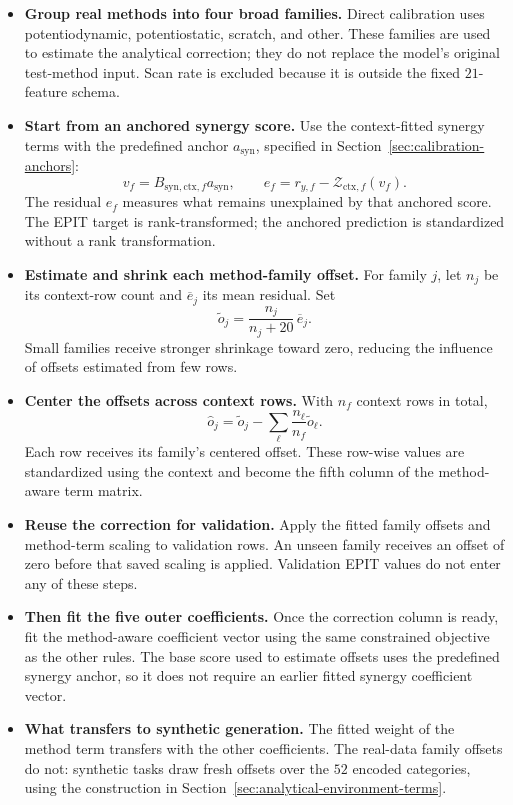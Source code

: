 \documentclass[11pt]{article}
\newenvironment{notes}
  {\begin{itemize}\setlength{\itemsep}{0.45em}\setlength{\parsep}{0pt}}
  {\end{itemize}}
\begin{document}
\begin{notes}
    \item \textbf{Group real methods into four broad families.}
    Direct calibration uses potentiodynamic, potentiostatic,
    scratch, and other. These families are used to estimate
    the analytical correction; they do not replace the model's
    original test-method input.
    Scan rate is excluded because it is outside the fixed
    \(21\)-feature schema.

    \item \textbf{Start from an anchored synergy score.}
    Use the context-fitted synergy terms with the predefined
    anchor \(a_{\mathrm{syn}}\), specified in
    Section~\ref{sec:calibration-anchors}:
    \[
        v_f=B_{\mathrm{syn},\mathrm{ctx},f}a_{\mathrm{syn}},
        \qquad
        e_f=r_{y,f}-\mathcal{Z}_{\mathrm{ctx},f}(v_f).
    \]
    The residual \(e_f\) measures what remains unexplained by
    that anchored score. The EPIT target is rank-transformed;
    the anchored prediction is standardized without a rank
    transformation.

    \item \textbf{Estimate and shrink each method-family offset.}
    For family \(j\), let \(n_j\) be its context-row count
    and \(\overline e_j\) its mean residual. Set
    \[
        \widetilde o_j
        =
        \frac{n_j}{n_j+20}\,\overline e_j.
    \]
    Small families receive stronger shrinkage toward zero,
    reducing the influence of offsets estimated from few rows.

    \item \textbf{Center the offsets across context rows.}
    With \(n_f\) context rows in total,
    \[
        \widehat o_j
        =
        \widetilde o_j
        -
        \sum_{\ell}\frac{n_\ell}{n_f}\widetilde o_\ell.
    \]
    Each row receives its family's centered offset. These
    row-wise values are standardized using the context and
    become the fifth column of the method-aware term matrix.

    \item \textbf{Reuse the correction for validation.}
    Apply the fitted family offsets and method-term scaling
    to validation rows. An unseen family receives an offset
    of zero before that saved scaling is applied.
    Validation EPIT values do not enter any of these steps.

    \item \textbf{Then fit the five outer coefficients.}
    Once the correction column is ready, fit the method-aware
    coefficient vector using the same constrained objective as
    the other rules. The base score used to estimate offsets
    uses the predefined synergy anchor, so it does not require
    an earlier fitted synergy coefficient vector.

    \item \textbf{What transfers to synthetic generation.}
    The fitted weight of the method term transfers with the
    other coefficients. The real-data family offsets do not:
    synthetic tasks draw fresh offsets over the \(52\) encoded
    categories, using the construction in
    Section~\ref{sec:analytical-environment-terms}.
\end{notes}
\end{document}
